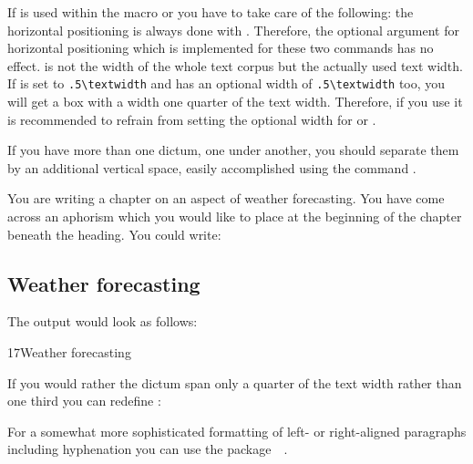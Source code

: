 If  is used within the macro 
or  you have to take care of the following: the
horizontal positioning is always done with .
Therefore, the optional argument for horizontal positioning which is
implemented for these two commands has no effect.  is
not the width of the whole text corpus but the actually used text
width.  If  is set to \verb;.5\textwidth; and
 has an optional width of
\verb;.5\textwidth; too, you will get a box with a width one quarter
of the text width.  Therefore, if you use  it is
recommended to refrain from setting the optional width for
 or .

If you have more than one dictum, one under another, you should
separate them by an additional vertical space, easily accomplished using the
command .

\begin{Example}
  You are writing a chapter on an aspect of weather forecasting. You
  have come across an aphorism which you would like to place at the
  beginning of the chapter beneath the heading. You could write:
\begin{lstcode}
  \chapter{Weather forecasting}
\end{lstcode}
  The output would look as follows:
  \begin{ShowOutput}
    {%
      17\enskip Weather forecasting\par} \vspace{\baselineskip}
  \end{ShowOutput}

  If you would rather the dictum span only a quarter of the text width
  rather than one third you can redefine :
\begin{lstcode}
  \renewcommand*{\dictumwidth}{.25\textwidth}
\end{lstcode}
\end{Example}

For a somewhat more sophisticated formatting of left- or right-aligned
paragraphs including hyphenation you can use the
package~~\cite{package:ragged2e}.%
\fi
%
%
%
%
%
%
%
%
%
%
%
%
\fi  %


